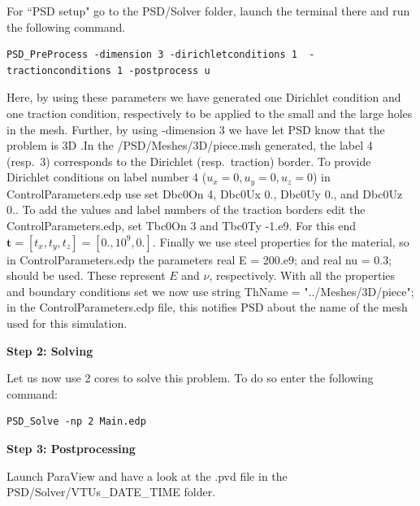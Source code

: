 For ``PSD setup" go to the {\ttfamily PSD/Solver} folder, launch the terminal there and run the following command.
\begin{lstlisting}[style=Linux]
PSD_PreProcess -dimension 3 -dirichletconditions 1  -tractionconditions 1 -postprocess u
\end{lstlisting}
Here, by using these parameters we have generated one Dirichlet condition and one traction condition, respectively to be applied to the small and the large holes in the mesh. Further, by using {\ttfamily -dimension 3} we have let PSD know that the problem is 3D .In the {\ttfamily /PSD/Meshes/3D/piece.msh} generated, the label 4 (resp.~3) corresponds to the Dirichlet (resp.~traction) border. 
To provide Dirichlet conditions on label number 4 ($u_x=0,u_y=0,u_z=0$) in {\ttfamily ControlParameters.edp} use set {\ttfamily Dbc0On 4}, {\ttfamily Dbc0Ux 0.}, {\ttfamily Dbc0Uy 0.}, and {\ttfamily Dbc0Uz 0.}. To add the values and label numbers of the traction borders edit the  {\ttfamily ControlParameters.edp}, set  {\ttfamily Tbc0On 3} and {\ttfamily Tbc0Ty -1.e9}. For this end $\mathbf t=[t_x,t_y,t_z]=[0.,10^9,0.]$. Finally we use steel properties for the material, so in {\ttfamily ControlParameters.edp} the parameters {\ttfamily real E  = 200.e9;} and {\ttfamily real nu = 0.3;} should be used. These represent $E$ and $\nu$, respectively. With all the properties and boundary conditions set we now use  {\ttfamily string ThName = "../Meshes/3D/piece";} in the {\ttfamily ControlParameters.edp} file, this notifies PSD about the name of the mesh used for this simulation.  

\textbf{Step 2: Solving}

Let us now use 2 cores to solve this problem. To do so enter the following command:

\begin{lstlisting}[style=Linux]
PSD_Solve -np 2 Main.edp
\end{lstlisting}

\textbf{Step 3: Postprocessing}

Launch ParaView and have a look at the  {\ttfamily .pvd} file in the  {\ttfamily PSD/Solver/VTUs\_DATE\_TIME} folder. 

